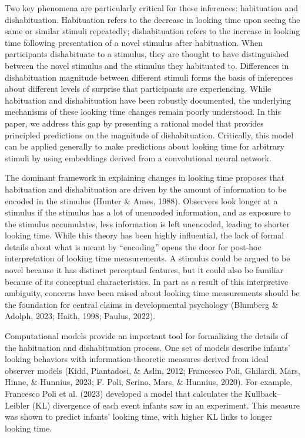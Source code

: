 \documentclass[10pt, letterpaper]{article}
\begin{document}
Two key phenomena are particularly critical for these inferences:
habituation and dishabituation. Habituation refers to the decrease in
looking time upon seeing the same or similar stimuli repeatedly;
dishabituation refers to the increase in looking time following
presentation of a novel stimulus after habituation. When participants
dishabituate to a stimulus, they are thought to have distinguished
between the novel stimulus and the stimulus they habituated to.
Differences in dishabituation magnitude between different stimuli forms
the basis of inferences about different levels of surprise that
participants are experiencing. While habituation and dishabituation have
been robustly documented, the underlying mechanisms of these looking
time changes remain poorly understood. In this paper, we address this
gap by presenting a rational model that provides principled predictions
on the magnitude of dishabituation. Critically, this model can be
applied generally to make predictions about looking time for arbitrary
stimuli by using embeddings derived from a convolutional neural network.

The dominant framework in explaining changes in looking time proposes
that habituation and dishabituation are driven by the amount of
information to be encoded in the stimulus (Hunter \& Ames, 1988).
Observers look longer at a stimulus if the stimulus has a lot of
unencoded information, and as exposure to the stimulus accumulates, less
information is left unencoded, leading to shorter looking time. While
this theory has been highly influential, the lack of formal details
about what is meant by ``encoding'' opens the door for post-hoc
interpretation of looking time measurements. A stimulus could be argued
to be novel because it has distinct perceptual features, but it could
also be familiar because of its conceptual characteristics. In part as a
result of this interpretive ambiguity, concerns have been raised about
looking time measurements should be the foundation for central claims in
developmental psychology (Blumberg \& Adolph, 2023; Haith, 1998; Paulus,
2022).

Computational models provide an important tool for formalizing the
details of the habituation and dishabituation process. One set of models
describe infants' looking behaviors with information-theoretic measures
derived from ideal observer models (Kidd, Piantadosi, \& Aslin, 2012;
Francesco Poli, Ghilardi, Mars, Hinne, \& Hunnius, 2023; F. Poli,
Serino, Mars, \& Hunnius, 2020). For example, Francesco Poli et al.
(2023) developed a model that calculates the Kullback--Leibler (KL)
divergence of each event infants saw in an experiment. This measure was
shown to predict infants' looking time, with higher KL links to longer
looking time.
\end{document}
